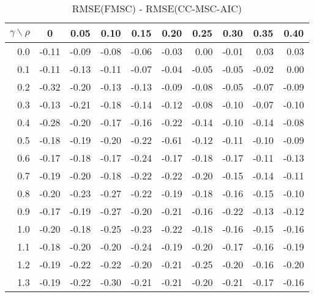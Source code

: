 \documentclass[12pt]{article}
\begin{document}
%
\begin{table}[!tbp]
\caption{RMSE(FMSC) - RMSE(CC-MSC-AIC)}
 \begin{center}
 \begin{tabular}{r|rrrrrrrrr}\hline\hline
\multicolumn{1}{c|}{$\gamma\backslash\rho$}&\multicolumn{1}{c}{0}&\multicolumn{1}{c}{0.05}&\multicolumn{1}{c}{0.10}&\multicolumn{1}{c}{0.15}&\multicolumn{1}{c}{0.20}&\multicolumn{1}{c}{0.25}&\multicolumn{1}{c}{0.30}&\multicolumn{1}{c}{0.35}&\multicolumn{1}{c}{0.40}\tabularnewline
\hline

0.0&-0.11&-0.09&-0.08&-0.06&-0.03& 0.00&-0.01& 0.03& 0.03\tabularnewline
0.1&-0.11&-0.13&-0.11&-0.07&-0.04&-0.05&-0.05&-0.02& 0.00\tabularnewline
0.2&-0.32&-0.20&-0.13&-0.13&-0.09&-0.08&-0.05&-0.07&-0.09\tabularnewline
0.3&-0.13&-0.21&-0.18&-0.14&-0.12&-0.08&-0.10&-0.07&-0.10\tabularnewline
0.4&-0.28&-0.20&-0.17&-0.16&-0.22&-0.14&-0.10&-0.14&-0.08\tabularnewline
0.5&-0.18&-0.19&-0.20&-0.22&-0.61&-0.12&-0.11&-0.10&-0.09\tabularnewline
0.6&-0.17&-0.18&-0.17&-0.24&-0.17&-0.18&-0.17&-0.11&-0.13\tabularnewline
0.7&-0.19&-0.20&-0.18&-0.22&-0.22&-0.20&-0.15&-0.14&-0.11\tabularnewline
0.8&-0.20&-0.23&-0.27&-0.22&-0.19&-0.18&-0.16&-0.15&-0.10\tabularnewline
0.9&-0.17&-0.19&-0.27&-0.20&-0.21&-0.16&-0.22&-0.13&-0.12\tabularnewline
1.0&-0.20&-0.18&-0.25&-0.23&-0.22&-0.18&-0.16&-0.15&-0.16\tabularnewline
1.1&-0.18&-0.20&-0.20&-0.24&-0.19&-0.20&-0.17&-0.16&-0.19\tabularnewline
1.2&-0.19&-0.22&-0.22&-0.20&-0.21&-0.25&-0.20&-0.16&-0.20\tabularnewline
1.3&-0.19&-0.22&-0.30&-0.21&-0.21&-0.20&-0.21&-0.17&-0.16\tabularnewline
\hline
\end{tabular}

\end{center}

\end{table}
\end{document}
